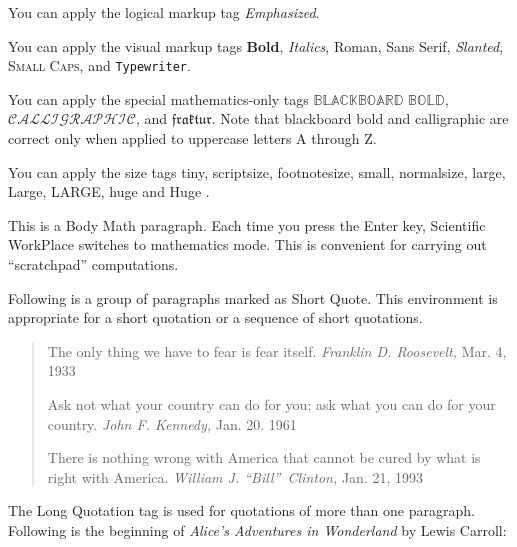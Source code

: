 \documentclass{article}
\begin{document}
You can apply the logical markup tag \emph{Emphasized}.

You can apply the visual markup tags \textbf{Bold}, \textit{Italics}, 
\textrm{Roman}, \textsf{Sans Serif}, \textsl{Slanted}, \textsc{Small Caps},
and \texttt{Typewriter}.

You can apply the special mathematics-only tags $\mathbb{BLACKBOARD}$ $%
\mathbb{BOLD}$, $\mathcal{CALLIGRAPHIC}$, and $\mathfrak{fraktur}$. Note
that blackboard bold and calligraphic are correct only when applied to
uppercase letters A through Z.

You can apply the size tags {\tiny tiny}, {\scriptsize scriptsize}, 
{\footnotesize footnotesize}, {\small small}, {\normalsize normalsize}, 
{\large large}, {\Large Large}, {\LARGE LARGE}, {\huge huge} and {\Huge Huge}%
.

This is a Body Math paragraph. Each time you press the Enter key, Scientific
WorkPlace switches to mathematics mode. This is convenient for carrying out
``scratchpad'' computations.

Following is a group of paragraphs marked as Short Quote. This environment
is appropriate for a short quotation or a sequence of short quotations.

\begin{quote}
The only thing we have to fear is fear itself. \emph{Franklin D. Roosevelt, }%
Mar. 4, 1933

Ask not what your country can do for you; ask what you can do for your
country. \emph{John F. Kennedy, }Jan. 20. 1961

There is nothing wrong with America that cannot be cured by what is right
with America. \emph{William J. \textquotedblleft Bill\textquotedblright\
Clinton, }Jan. 21, 1993
\end{quote}

The Long Quotation tag is used for quotations of more than one paragraph.
Following is the beginning of \emph{Alice's Adventures in Wonderland }by
Lewis Carroll:
\end{document}

